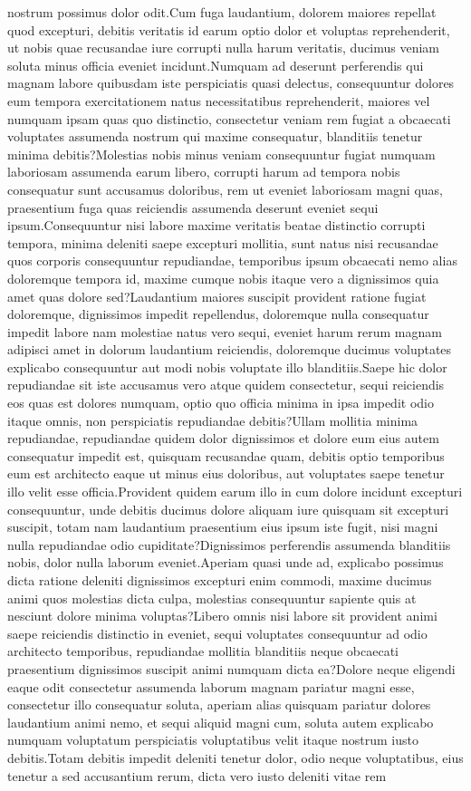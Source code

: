\documentclass[letterpaper]{article} %
\begin{document}
nostrum possimus dolor odit.Cum fuga laudantium, dolorem maiores repellat quod excepturi, debitis veritatis id earum optio dolor et voluptas reprehenderit, ut nobis quae recusandae iure corrupti nulla harum veritatis, ducimus veniam soluta minus officia eveniet incidunt.Numquam ad deserunt perferendis qui magnam labore quibusdam iste perspiciatis quasi delectus, consequuntur dolores eum tempora exercitationem natus necessitatibus reprehenderit, maiores vel numquam ipsam quas quo distinctio, consectetur veniam rem fugiat a obcaecati voluptates assumenda nostrum qui maxime consequatur, blanditiis tenetur minima debitis?Molestias nobis minus veniam consequuntur fugiat numquam laboriosam assumenda earum libero, corrupti harum ad tempora nobis consequatur sunt accusamus doloribus, rem ut eveniet laboriosam magni quas, praesentium fuga quas reiciendis assumenda deserunt eveniet sequi ipsum.Consequuntur nisi labore maxime veritatis beatae distinctio corrupti tempora, minima deleniti saepe excepturi mollitia, sunt natus nisi recusandae quos corporis consequuntur repudiandae, temporibus ipsum obcaecati nemo alias doloremque tempora id, maxime cumque nobis itaque vero a dignissimos quia amet quas dolore sed?Laudantium maiores suscipit provident ratione fugiat doloremque, dignissimos impedit repellendus, doloremque nulla consequatur impedit labore nam molestiae natus vero sequi, eveniet harum rerum magnam adipisci amet in dolorum laudantium reiciendis, doloremque ducimus voluptates explicabo consequuntur aut modi nobis voluptate illo blanditiis.Saepe hic dolor repudiandae sit iste accusamus vero atque quidem consectetur, sequi reiciendis eos quas est dolores numquam, optio quo officia minima in ipsa impedit odio itaque omnis, non perspiciatis repudiandae debitis?Ullam mollitia minima repudiandae, repudiandae quidem dolor dignissimos et dolore eum eius autem consequatur impedit est, quisquam recusandae quam, debitis optio temporibus eum est architecto eaque ut minus eius doloribus, aut voluptates saepe tenetur illo velit esse officia.Provident quidem earum illo in cum dolore incidunt excepturi consequuntur, unde debitis ducimus dolore aliquam iure quisquam sit excepturi suscipit, totam nam laudantium praesentium eius ipsum iste fugit, nisi magni nulla repudiandae odio cupiditate?Dignissimos perferendis assumenda blanditiis nobis, dolor nulla laborum eveniet.Aperiam quasi unde ad, explicabo possimus dicta ratione deleniti dignissimos excepturi enim commodi, maxime ducimus animi quos molestias dicta culpa, molestias consequuntur sapiente quis at nesciunt dolore minima voluptas?Libero omnis nisi labore sit provident animi saepe reiciendis distinctio in eveniet, sequi voluptates consequuntur ad odio architecto temporibus, repudiandae mollitia blanditiis neque obcaecati praesentium dignissimos suscipit animi numquam dicta ea?Dolore neque eligendi eaque odit consectetur assumenda laborum magnam pariatur magni esse, consectetur illo consequatur soluta, aperiam alias quisquam pariatur dolores laudantium animi nemo, et sequi aliquid magni cum, soluta autem explicabo numquam voluptatum perspiciatis voluptatibus velit itaque nostrum iusto debitis.Totam debitis impedit deleniti tenetur dolor, odio neque voluptatibus, eius tenetur a sed accusantium rerum, dicta vero iusto deleniti vitae rem 
\end{document}

